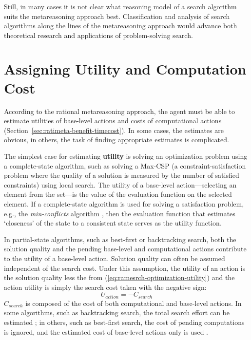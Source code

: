 Still, in many cases it is not clear what reasoning model of a search
algorithm suits the metareasoning approach best. Classification
and analysis of search algorithms along the lines of the metareasoning
approach would advance both theoretical research and applications of
problem-solving search.

\section{Assigning Utility and Computation Cost}

According to the rational metareasoning approach, the agent must be
able to estimate utilities of base-level actions and costs of
computational actions
(Section~\ref{sec:ratimeta-benefit-timecost}). In some cases, the
estimates are obvious, in others, the task of finding appropriate
estimates is complicated.

The simplest case for estimating {\bf utility} is solving an
optimization problem using a complete-state algorithm, such as solving
a Max-CSP (a constraint-satisfaction problem where the quality of a
solution is measured by the number of satisfied constraints) using
local search. The utility  of a base-level action---selecting an
element from the set---is the value of the evaluation function on the
selected element. If a complete-state algorithm is used for solving a
satisfaction problem, e.g., the {\em min-conflicts} algorithm
\cite{Russell.aima}, then the evaluation function that estimates
`closeness' of the state to a consistent state serves as the utility
 function.

In partial-state algorithms, such as best-first or backtracking
search, both the solution quality and the pending base-level and
computational actions contribute to the utility of a base-level
action. Solution quality can often be assumed independent of the
search cost. Under this assumption, the utility of an action is the solution quality
less the  from (\ref{eq:ramesrch-optimization-utility}) 
and the action utility is simply the search cost taken with
the negative sign:
\begin{equation}
\label{eq:ramesrch-satisfaction-utility} U_{action}=-C_{search}
\end{equation} $C_{search}$ is composed of the cost of both
computational and base-level actions. In some algorithms, such as
backtracking search, the total search effort can be estimated
\cite{Knuth.backtrack}\cite{Refalo.impact}; in others, such as
best-first search, the cost of pending computations is ignored, and
the estimated cost of base-level actions only is used
\cite{Russell.right}.

